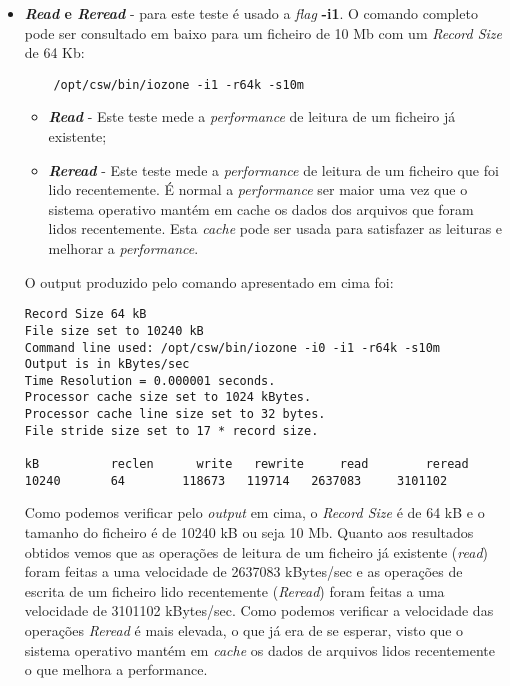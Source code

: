 \documentclass[conference,compsoc]{IEEEtran}
\begin{document}
\begin{itemize}
	
	
	\item \textbf{\textit{Read} e \textit{Reread}} - para este teste é usado a \textit{flag} \textbf{-i1}. O comando completo pode ser consultado em baixo para um ficheiro de 10 Mb com um \textit{Record Size} de 64 Kb:
	
	\begin{lstlisting}
	/opt/csw/bin/iozone -i1 -r64k -s10m
	\end{lstlisting}
	
	\begin{itemize}
		\item \textbf{\textit{Read}} - Este teste mede a \textit{performance} de leitura de um ficheiro já existente;
		\item \textbf{\textit{Reread}} - Este teste mede a \textit{performance} de leitura de um ficheiro que foi lido recentemente. É normal a \textit{performance} ser maior uma vez que o sistema operativo mantém em cache os dados dos arquivos que foram lidos recentemente. Esta \textit{cache} pode ser usada para satisfazer as leituras e melhorar a \textit{performance}.
	\end{itemize}
	
	O output produzido pelo comando apresentado em cima foi:
	
\begin{lstlisting}
Record Size 64 kB
File size set to 10240 kB
Command line used: /opt/csw/bin/iozone -i0 -i1 -r64k -s10m
Output is in kBytes/sec
Time Resolution = 0.000001 seconds.
Processor cache size set to 1024 kBytes.
Processor cache line size set to 32 bytes.
File stride size set to 17 * record size.

kB  		reclen    	write  	rewrite    	read    	reread    
10240       64   	  118673   119714  	2637083  	3101102
\end{lstlisting}	

Como podemos verificar pelo \textit{output} em cima, o \textit{Record Size} é de 64 kB e o tamanho do ficheiro é de 10240 kB ou seja 10 Mb. Quanto aos resultados obtidos vemos que as operações de leitura de um ficheiro já existente (\textit{read}) foram feitas a uma velocidade de 2637083 kBytes/sec e as operações de escrita de um ficheiro lido recentemente (\textit{Reread}) foram feitas a uma velocidade de 3101102 kBytes/sec. Como podemos verificar a velocidade das operações \textit{Reread} é mais elevada, o que já era de se esperar, visto que o sistema operativo mantém em \textit{cache} os dados de arquivos lidos recentemente o que melhora a performance.
	
\end{itemize}
\end{document}
